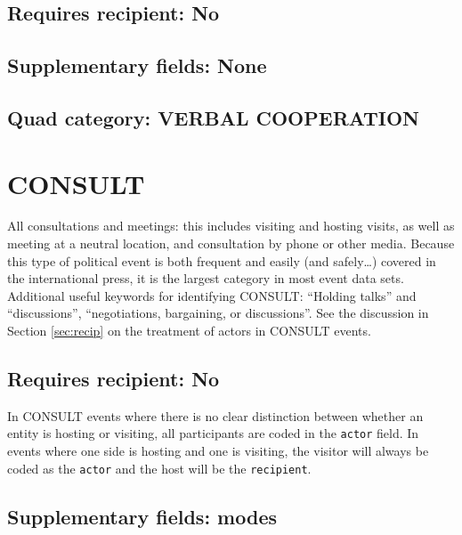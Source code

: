 \documentclass[11pt]{report}
\newcommand{\plcat}[1]{\textsf{#1}}
\newcommand{\txt}[1]{\texttt{#1}}
\begin{document}
\subsection{Requires recipient: No}

\subsection{Supplementary fields: None}

\subsection{Quad category: VERBAL COOPERATION}

\newpage

\section{CONSULT}

All consultations and meetings: this includes visiting and hosting visits, as well as meeting at a neutral location, and consultation by phone or other media. Because this type of political event is both frequent and easily (and safely\ldots) covered in the international press, it is the largest category in most event data sets.  Additional useful keywords for identifying \plcat{CONSULT}: ``Holding talks'' and ``discussions'', ``negotiations, bargaining, or discussions''. See the discussion in Section \ref{sec:recip} on the treatment of actors in \plcat{CONSULT} events.

\subsection{Requires recipient: No}

In \plcat{CONSULT} events where there is no clear distinction between whether an entity is hosting or visiting, all participants are coded in the \txt{actor} field. In events where one side is hosting and one is visiting, the visitor will always be coded as the \txt{actor} and the host will be the \txt{recipient}.

\subsection{Supplementary fields: modes}
\end{document}
